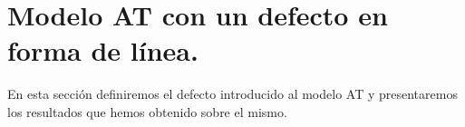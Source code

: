 \section{Modelo AT con un defecto en forma de línea.}
\label{sec:AT_line_intro}
En esta sección definiremos el defecto introducido al modelo AT y presentaremos los resultados que hemos obtenido sobre el mismo.\\
